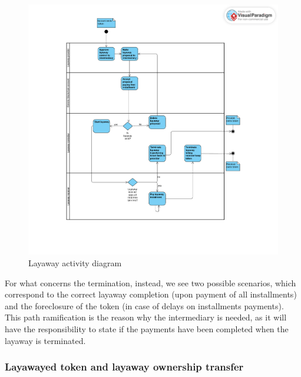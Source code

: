 \documentclass[english, LaM, oneside]{sapthesis}%
\begin{document}
\begin{figure}[H]
    \centering
        \begin{adjustbox}{width=1\textwidth}
            \includegraphics{ActivityDiagrams/activity_layaway.pdf} 
        \end{adjustbox}
    \caption{Layaway activity diagram}
    \label{fig:Layaway AD}
\end{figure}

For what concerns the termination, instead, we see two possible scenarios, which correspond to the correct layaway completion (upon payment of all installments) and the foreclosure of the token (in case of delays on installments payments). This path ramification is the reason why the intermediary is needed, as it will have the responsibility to state if the payments have been completed when the layaway is terminated.

\subsubsection{Layawayed token and layaway ownership transfer}
\end{document}
